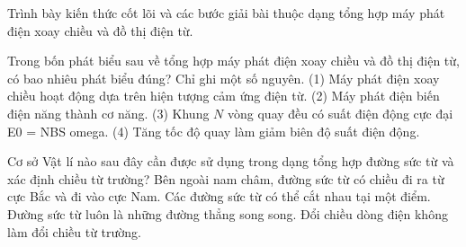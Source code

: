 \begin{bt}
Trình bày kiến thức cốt lõi và các bước giải bài thuộc dạng tổng hợp máy phát điện xoay chiều và đồ thị điện từ.
\end{bt}

\begin{ex}
Trong bốn phát biểu sau về tổng hợp máy phát điện xoay chiều và đồ thị điện từ, có bao nhiêu phát biểu đúng? Chỉ ghi một số nguyên. (1) Máy phát điện xoay chiều hoạt động dựa trên hiện tượng cảm ứng điện từ. (2) Máy phát điện biến điện năng thành cơ năng. (3) Khung $N$ vòng quay đều có suất điện động cực đại E0 = NBS omega. (4) Tăng tốc độ quay làm giảm biên độ suất điện động.
\end{ex}

\begin{ex}
Cơ sở Vật lí nào sau đây cần được sử dụng trong dạng tổng hợp đường sức từ và xác định chiều từ trường?
\choice
{\True Bên ngoài nam châm, đường sức từ có chiều đi ra từ cực Bắc và đi vào cực Nam.}
{Các đường sức từ có thể cắt nhau tại một điểm.}
{Đường sức từ luôn là những đường thẳng song song.}
{Đổi chiều dòng điện không làm đổi chiều từ trường.}
\end{ex}

